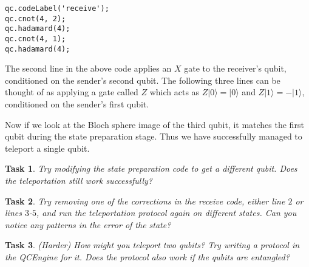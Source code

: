 \documentclass[twocolumn]{article}
\newtheorem{task}{Task}[section]
\begin{document}
\begin{lstlisting}
qc.codeLabel('receive');
qc.cnot(4, 2);
qc.hadamard(4);
qc.cnot(4, 1);
qc.hadamard(4);
\end{lstlisting}

The second line in the above code applies an $X$ gate to the receiver's qubit, conditioned on the sender's second qubit. The following three lines can be thought of as applying a gate called $Z$ which acts as $Z|0\rangle = |0\rangle$ and $Z|1\rangle = -|1\rangle$, conditioned on the sender's first qubit.

Now if we look at the Bloch sphere image of the third qubit, it matches the first qubit during the state preparation stage. Thus we have successfully managed to teleport a single qubit.

\begin{task}
Try modifying the state preparation code to get a different qubit. Does the teleportation still work successfully?
\end{task}

\begin{task}
Try removing one of the corrections in the receive code, either line $2$ or lines $3$-$5$, and run the teleportation protocol again on different states. Can you notice any patterns in the error of the state?
\end{task}

\begin{task}
(Harder) How might you teleport two qubits? Try writing a protocol in the QCEngine for it. Does the protocol also work if the qubits are entangled?
\end{task}
\end{document}
